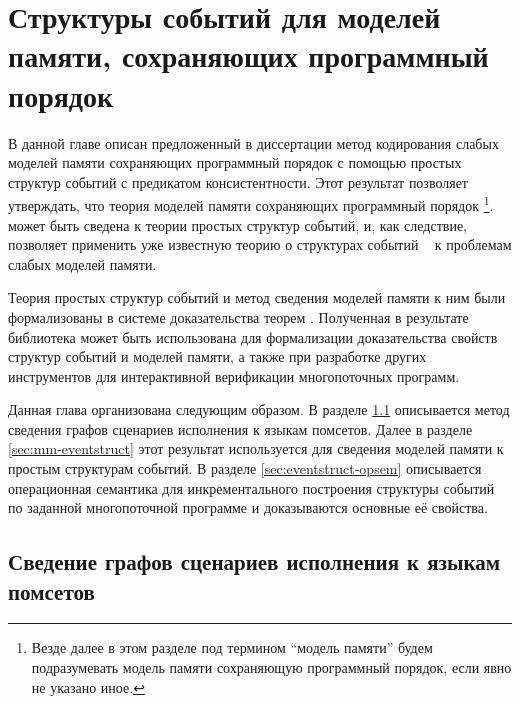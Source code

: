 \chapter{Структуры событий для моделей памяти, сохраняющих программный порядок}
\label{ch:porf-evenstruct}

В данной главе описан предложенный в диссертации метод 
кодирования слабых моделей памяти сохраняющих программный порядок 
с помощью простых структур событий с предикатом консистентности. 
Этот результат позволяет утверждать, что теория  
моделей памяти сохраняющих программный порядок%
\footnote{Везде далее в этом разделе 
под термином ``модель памяти'' будем подразумевать 
модель памяти сохраняющую программный порядок, если явно не указано иное.}.
может быть сведена к теории простых структур событий, 
и, как следствие, позволяет применить уже известную теорию о структурах событий%
~\cite{Winskel:86,Vaandrager:TCS1991,Sassone:MFCS1993,Nielsen:REX93,Winskel-TCS:09}
к проблемам слабых моделей памяти.

Теория простых структур событий и метод сведения 
моделей памяти к ним были формализованы в системе 
доказательства теорем \coq. 
Полученная в результате библиотека может быть использована 
для формализации доказательства свойств структур событий 
и моделей памяти, а также при разработке других
инструментов для интерактивной верификации многопоточных программ.

Данная глава организована следующим образом. 
В разделе \cref{sec:pomset-graphs} описывается метод 
сведения графов сценариев исполнения к языкам помсетов. 
Далее в разделе \cref{sec:mm-eventstruct} этот результат 
используется для сведения моделей памяти к простым структурам событий. 
В разделе \cref{sec:eventstruct-opsem} описывается 
операционная семантика для инкрементального построения 
структуры событий по заданной многопоточной программе 
и доказываются основные её свойства. 

\section{Сведение графов сценариев исполнения к языкам помсетов}
\label{sec:pomset-graphs}

